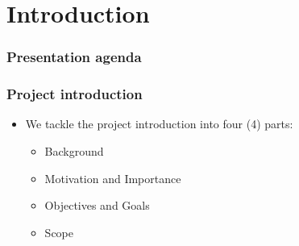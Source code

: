 \section{Introduction}
\begin{frame}
\frametitle{Presentation agenda}
\tableofcontents[currentsection]
\end{frame}

\begin{frame}
\frametitle{Project introduction}
	\begin{itemize}
		\item We tackle the project introduction into four (4) parts:
			\begin{itemize}
				\item Background
				\item Motivation and Importance
				\item Objectives and Goals
				\item Scope
			\end{itemize}
	\end{itemize}
\end{frame}





